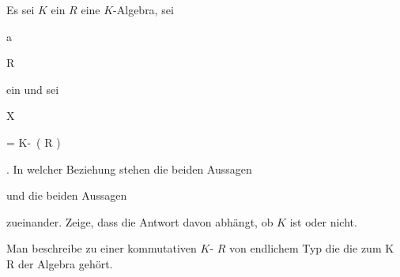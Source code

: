 {


Es sei $K$ ein
$R$ eine
$K$-Algebra, sei


\mavergleichskette

{\vergleichskette

{ {\mathfrak a}
}

{ \subseteq }{ R
}

{  }{
}

{    }{
}

{   }{
}

}
{}{}{}
ein
und sei


\mavergleichskette

{\vergleichskette

{ X
}

{ = }{ K\!-\!\, \left(  R  \right)
}

{  }{
}

{    }{
}

{   }{
}

}
{}{}{.}
In welcher Beziehung stehen die beiden Aussagen


 {  }


und die beiden Aussagen


 {  }


zueinander. Zeige, dass die Antwort davon abhängt, ob $K$
ist oder nicht.


}

{} {}



{}

{


Man beschreibe zu einer kommutativen
$K$-
$R$ von endlichem Typ die
die zum
\maabb {} {K} {R
} {}
der Algebra gehört.


}

{} {}



{}

